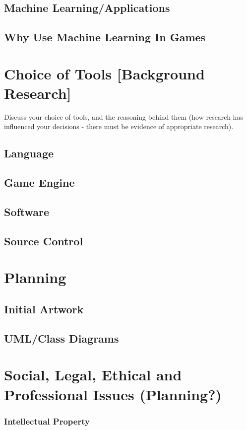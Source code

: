 \documentclass[runningheads,a4paper]{llncs}
\begin{document}
	\subsection{Machine Learning/Applications}	
	\subsection{Why Use Machine Learning In Games}

	
\section{Choice of Tools [Background Research]}
Discuss your choice of tools, and the reasoning behind them (how research has influenced your decisions - there must be evidence of appropriate research).

	\subsection{Language}
	\subsection{Game Engine}
	\subsection{Software}
	\subsection{Source Control}

\section{Planning}
	\subsection{Initial Artwork}
	\subsection{UML/Class Diagrams}

\section{Social, Legal, Ethical and Professional Issues (Planning?)}
		\subsubsection{Intellectual Property}
\end{document}
